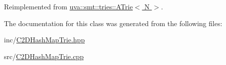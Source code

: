 Reimplemented from \hyperlink{classuva_1_1smt_1_1tries_1_1_a_trie_a4c523028bdf0949d762d1bbfd3fdc262}{uva\+::smt\+::tries\+::\+A\+Trie$<$ N $>$}.



The documentation for this class was generated from the following files\+:\begin{DoxyCompactItemize}
\item 
inc/\hyperlink{_c2_d_hash_map_trie_8hpp}{C2\+D\+Hash\+Map\+Trie.\+hpp}\item 
src/\hyperlink{_c2_d_hash_map_trie_8cpp}{C2\+D\+Hash\+Map\+Trie.\+cpp}\end{DoxyCompactItemize}
